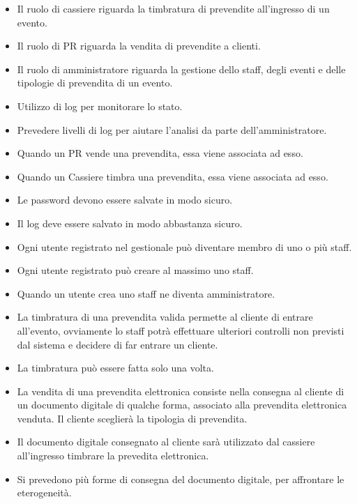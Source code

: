 \documentclass[a4paper]{article}
\begin{document}
\begin{itemize}
\begin{itemize}
		\item Il ruolo di cassiere riguarda la timbratura di prevendite all'ingresso di un evento.
		\item Il ruolo di PR riguarda la vendita di prevendite a clienti.
		\item Il ruolo di amministratore riguarda la gestione dello staff, degli eventi e delle tipologie di prevendita di un evento.
		
		\item Utilizzo di log per monitorare lo stato.
		\item Prevedere livelli di log per aiutare l'analisi da parte dell'amministratore.
		
		\item Quando un PR vende una prevendita, essa viene associata ad esso.
		\item Quando un Cassiere timbra una prevendita, essa viene associata ad esso.
		
		\item Le password devono essere salvate in modo sicuro.
		\item Il log deve essere salvato in modo abbastanza sicuro.
		
		
		\item Ogni utente registrato nel gestionale può diventare membro di uno o più staff. 
		\item Ogni utente registrato può creare al massimo uno staff.
		\item Quando un utente crea uno staff ne diventa amministratore.
		
		\item La timbratura di una prevendita valida permette al cliente di entrare all'evento, ovviamente lo staff potrà effettuare ulteriori controlli non previsti dal sistema e decidere di far entrare un cliente.
		\item La timbratura può essere fatta solo una volta.
		
		\item La vendita di una prevendita elettronica consiste nella consegna al cliente di un documento digitale di qualche forma, associato alla prevendita elettronica venduta. Il cliente sceglierà la tipologia di prevendita.
		\item Il documento digitale consegnato al cliente sarà utilizzato dal cassiere all'ingresso timbrare la prevedita elettronica.
		\item Si prevedono più forme di consegna del documento digitale, per affrontare le eterogeneità.
		

\end{itemize}
\end{itemize}
\end{document}
